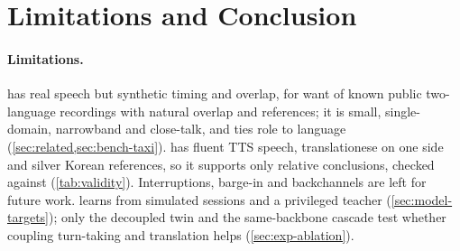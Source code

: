 \section{Limitations and Conclusion}
\label{sec:conclusion}

\paragraph{Limitations.}
\taxi has real speech but synthetic timing and overlap, for want of known public two-language recordings with natural overlap and references; it is small, single-domain, narrowband and close-talk, and ties role to language (\cref{sec:related,sec:bench-taxi}).
\syn has fluent TTS speech, translationese on one side and silver Korean references, so it supports only relative conclusions, checked against \taxi (\cref{tab:validity}).
Interruptions, barge-in and backchannels are left for future work.
\model learns from simulated sessions and a privileged teacher (\cref{sec:model-targets}); only the decoupled twin and the same-backbone cascade test whether coupling turn-taking and translation helps (\cref{sec:exp-ablation}).

